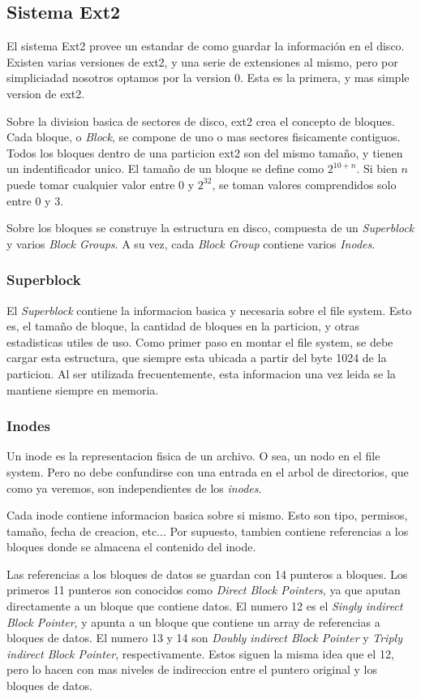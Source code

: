 \documentclass[a4paper,10pt]{article}
\begin{document}
\subsection{Sistema Ext2}
El sistema Ext2 provee un estandar de como guardar la información en el disco.
Existen varias versiones de ext2, y una serie de extensiones al mismo, pero por simpliciadad nosotros optamos por la version 0.
Esta es la primera, y mas simple version de ext2.

Sobre la division basica de sectores de disco, ext2 crea el concepto de bloques.
Cada bloque, o \textit{Block}, se compone de uno o mas sectores fisicamente contiguos.
Todos los bloques dentro de una particion ext2 son del mismo tamaño, y tienen un indentificador unico.
El tamaño de un bloque se define como $ 2^{10 + n} $.
Si bien $n$ puede tomar cualquier valor entre 0 y $ 2^{32} $, se toman valores comprendidos solo entre 0 y 3.

Sobre los bloques se construye la estructura en disco, compuesta de un \textit{Superblock} y varios \textit{Block Groups}.
A su vez, cada \textit{Block Group} contiene varios \textit{Inodes}.

\subsubsection{Superblock}
El \textit{Superblock} contiene la informacion basica y necesaria sobre el file system.
Esto es, el tamaño de bloque, la cantidad de bloques en la particion, y otras estadisticas utiles de uso.
Como primer paso en montar el file system, se debe cargar esta estructura, que siempre esta ubicada a partir del byte 1024 de la particion.
Al ser utilizada frecuentemente, esta informacion una vez leida se la mantiene siempre en memoria.

\subsubsection{Inodes}
Un inode es la representacion fisica de un archivo.
O sea, un nodo en el file system.
Pero no debe confundirse con una entrada en el arbol de directorios, que como ya veremos, son independientes de los \textit{inodes}.

Cada inode contiene informacion basica sobre si mismo.
Esto son tipo, permisos, tamaño, fecha de creacion, etc...
Por supuesto, tambien contiene referencias a los bloques donde se almacena el contenido del inode.

Las referencias a los bloques de datos se guardan con 14 punteros a bloques.
Los primeros 11 punteros son conocidos como \textit{Direct Block Pointers}, ya que aputan directamente a un bloque que contiene datos.
El numero 12 es el \textit{Singly indirect Block Pointer}, y apunta a un bloque que contiene un array de referencias a bloques de datos.
El numero 13 y 14 son \textit{Doubly indirect Block Pointer} y \textit{Triply indirect Block Pointer}, respectivamente.
Estos siguen la misma idea que el 12, pero lo hacen con mas niveles de indireccion entre el puntero original y los bloques de datos.
\end{document}
